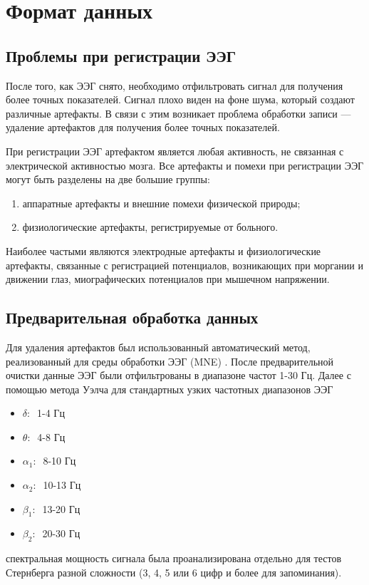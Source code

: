 \newpage

\section{Формат данных}

\subsection{Проблемы при регистрации ЭЭГ}

После того, как ЭЭГ снято, необходимо отфильтровать сигнал для получения более точных
показателей. Сигнал плохо виден на фоне шума, который создают различные артефакты.
В связи с этим возникает проблема обработки записи --- удаление артефактов для получения
более точных показателей.  

При регистрации ЭЭГ артефактом является любая активность, не связанная с электрической
активностью мозга. Все артефакты и помехи при регистрации ЭЭГ могут быть разделены на две большие группы:
\begin{enumerate}
    \item аппаратные артефакты и внешние помехи физической природы; 
    \item физиологические артефакты, регистрируемые от больного. 
\end{enumerate}
Наиболее частыми являются электродные артефакты и физиологические артефакты,
связанные с регистрацией потенциалов, возникающих при моргании и движении глаз,
миографических потенциалов при мышечном напряжении.  

\subsection{Предварительная обработка данных}

Для удаления артефактов был использованный автоматический метод, реализованный для
среды обработки ЭЭГ (MNE) \cite{MNE}. После предварительной очистки данные ЭЭГ были
отфильтрованы в диапазоне частот 1-30 Гц. Далее с помощью метода Уэлча для стандартных
узких частотных диапазонов ЭЭГ
\begin{itemize}
    \item $\delta:\:$ 1-4 Гц
    \item $\theta:\:$ 4-8 Гц
    \item $\alpha_1:\:$ 8-10 Гц
    \item $\alpha_2:\:$ 10-13 Гц
    \item $\beta_1:\:$ 13-20 Гц
    \item $\beta_2:\:$ 20-30 Гц
\end{itemize}
спектральная мощность сигнала была проанализирована отдельно для тестов Стернберга
разной сложности (3, 4, 5 или 6 цифр и более для запоминания).

